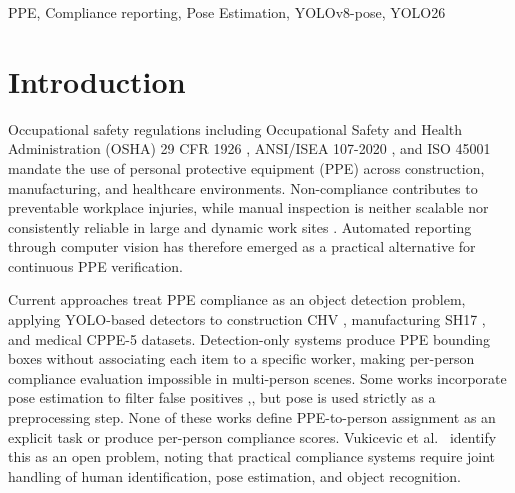 \documentclass[conference]{IEEEtran}
\begin{document}
\begin{abstract}
Automated systems that detect personal protective equipment (PPE) in images typically report only scene-level presence, failing to assign each item to a specific worker and preventing per-worker compliance checks required by safety regulations. This paper addresses this gap with Pose-Anchored Compliance Tracker (PACT), a three-stage pipeline. First, a YOLO26L detector locates PPE items and a YOLOv8x-pose model identifies workers and body keypoints. Second, a pose-anchored matching module attributes each detected PPE instance to the corresponding person. Third, a rule-based reporter computes fractional compliance scores and severity-tiered violation notices for each worker. We evaluate on three public datasets: construction-site CHV, medical PPE CPPE-5, and industrial SH17. PACT achieves mean average precision at IoU 0.50 (mAP\textsubscript{50}) of 0.923 on CHV and 0.652 on SH17, while per-person assignment accuracy reaches 0.938 on CHV and 0.892 on SH17. These results demonstrate that pose estimation enables reliable person-level PPE attribution and that assignment accuracy is a measurable target for compliance reporting.
\end{abstract}


\begin{IEEEkeywords}
PPE,
Compliance reporting,
Pose Estimation,
YOLOv8-pose,
YOLO26
\end{IEEEkeywords} 



\section{Introduction}
Occupational safety regulations including Occupational Safety and Health Administration (OSHA) 29 CFR 1926 \cite{OSHA_CFR1926}, ANSI/ISEA 107-2020 \cite{ANSI_ISEA107}, and ISO 45001 \cite{ISO45001} mandate the use of personal protective equipment (PPE) across construction, manufacturing, and healthcare environments. Non-compliance contributes to preventable workplace injuries, while manual inspection is neither scalable nor consistently reliable in large and dynamic work sites \cite{ref6}. Automated reporting through computer vision has therefore emerged as a practical alternative for continuous PPE verification.

Current approaches treat PPE compliance as an object detection problem, applying YOLO-based detectors to construction CHV \cite{ref5}, manufacturing SH17 \cite{ref2}, and medical CPPE-5 \cite{ref1} datasets. Detection-only systems produce PPE bounding boxes without associating each item to a specific worker, making per-person compliance evaluation impossible in multi-person scenes. Some works incorporate pose estimation to filter false positives \cite{ref8},\cite{ref12},\cite{ref13} but pose is used strictly as a preprocessing step. None of these works define PPE-to-person assignment as an explicit task or produce per-person compliance scores. Vukicevic et al.\ \cite{ref6} identify this as an open problem, noting that practical compliance systems require joint handling of human identification, pose estimation, and object recognition.
\end{document}
